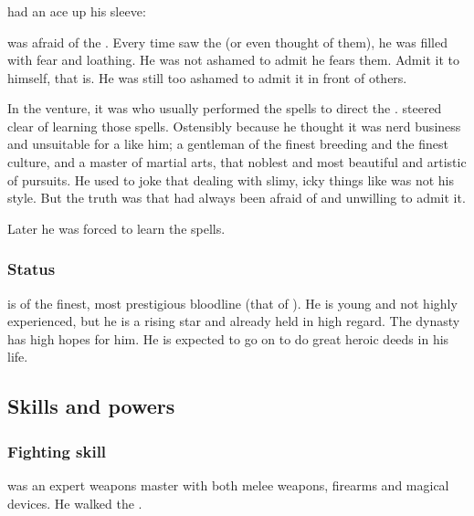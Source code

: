 \subsubsection{\Ghobaleth}
\Teshrial{} had an ace up his sleeve: 

\Teshrial was afraid of the \noggyaleth. 
Every time \Teshrial saw the \noggyaleth (or even thought of them), he was filled with fear and loathing. 
He was not ashamed to admit he fears them. 
Admit it to himself, that is.
He was still too ashamed to admit it in front of others.

In the \Malcur venture, it was \Urizeth who usually performed the spells to direct the \noggyaleth.
\Teshrial steered clear of learning those spells. 
Ostensibly because he thought it was nerd business and unsuitable for a \resphan like him; a gentleman of the finest breeding and the finest culture, and a master of martial arts, that noblest and most beautiful and artistic of pursuits. 
He used to joke that dealing with slimy, icky things like \noggyaleth was not his style. 
But the truth was that \Teshrial had always been afraid of \noggyaleth and unwilling to admit it. 

Later he was forced to learn the \noggyal spells. 




\subsubsection{Status}
\Teshrial{} is of the finest, most prestigious bloodline (that of \Azraid).
He is young and not highly experienced, but he is a rising star and already held in high regard. 
The dynasty has high hopes for him. 
He is expected to go on to do great heroic deeds in his life. 







\subsection{Skills and powers}





\subsubsection{Fighting skill}
\Teshrial{} was an expert weapons master with both melee weapons, firearms and magical devices. 
He walked the . 

